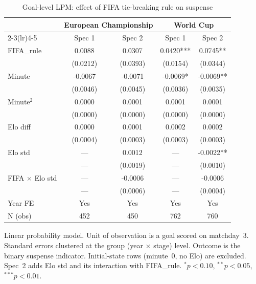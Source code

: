 
\begin{table}[H]
\centering
\caption{Goal-level LPM: effect of FIFA tie-breaking rule on suspense}
\label{tab:regression_mbm}
\begin{threeparttable}
\begin{tabular}{lcccc}
\toprule
 & \multicolumn{2}{c}{European Championship} & \multicolumn{2}{c}{World Cup} \\
\cmidrule(lr){2-3}\cmidrule(lr){4-5}
 & Spec 1 & Spec 2 & Spec 1 & Spec 2 \\
\midrule
FIFA\_rule & 0.0088 & 0.0307 & 0.0420*** & 0.0745** \\
       & (0.0212) & (0.0393) & (0.0154) & (0.0344) \\
Minute & -0.0067 & -0.0071 & -0.0069* & -0.0069** \\
       & (0.0046) & (0.0045) & (0.0036) & (0.0035) \\
Minute$^2$ & 0.0000 & 0.0001 & 0.0001 & 0.0001 \\
       & (0.0000) & (0.0000) & (0.0000) & (0.0000) \\
Elo diff & 0.0000 & 0.0001 & 0.0002 & 0.0002 \\
       & (0.0004) & (0.0003) & (0.0003) & (0.0003) \\
Elo std & --- & 0.0012 & --- & -0.0022** \\
       & --- & (0.0019) & --- & (0.0010) \\
FIFA $\times$ Elo std & --- & -0.0006 & --- & -0.0006 \\
       & --- & (0.0006) & --- & (0.0004) \\
\midrule
Year FE        & Yes & Yes & Yes & Yes \\
N (obs)        & 452 & 450 & 762 & 760 \\
\bottomrule
\end{tabular}
\begin{tablenotes}
\small
\item Linear probability model. Unit of observation is a goal scored on matchday~3.
Standard errors clustered at the group (year $\times$ stage) level.
Outcome is the binary suspense indicator. Initial-state rows (minute~0, no Elo)
are excluded. Spec~2 adds Elo std and its interaction with FIFA\_rule.
$^{*}p<0.10$, $^{**}p<0.05$, $^{***}p<0.01$.
\end{tablenotes}
\end{threeparttable}
\end{table}
